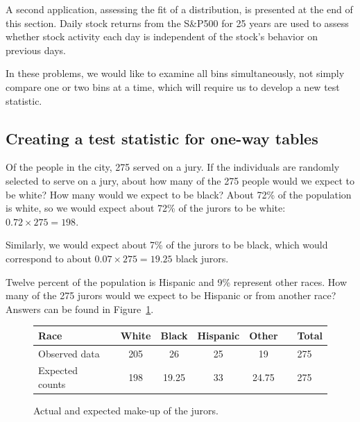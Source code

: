 A second application, assessing the fit of a distribution, is presented at the end of this section. Daily stock returns from the S\&P500 for 25 years are used to assess whether stock activity each day is independent of the stock's behavior on previous days.

In these problems, we would like to examine all bins simultaneously, not simply compare one or two bins at a time, which will require us to develop a new test statistic.


\subsection{Creating a test statistic for one-way tables}

\begin{examplewrap}
\begin{nexample}{Of the people in the city, 275 served on a jury. If the individuals are randomly selected to serve on a jury, about how many of the 275 people would we expect to be white? How many would we expect to be black?}
About 72\% of the population is white, so we would expect about 72\% of the jurors to be white: $0.72\times 275 = 198$.

Similarly, we would expect about 7\% of the jurors to be black, which would correspond to about $0.07\times 275 = 19.25$ black jurors.
\end{nexample}
\end{examplewrap}

\begin{exercisewrap}
\begin{nexercise}
Twelve percent of the population is Hispanic and 9\% represent other races. How many of the 275 jurors would we expect to be Hispanic or from another race? Answers can be found in Figure~\ref{expectedJuryRepresentationIfNoBias}.
\end{nexercise}
\end{exercisewrap}

\begin{figure}[h]
\centering
\begin{tabular}{ll ccc c ll}
\hline
Race	 & \hspace{2mm} & White & Black & Hispanic & Other & \hspace{2mm} & Total \\
\hline
Observed data			&	& 205 & 26	& 25 & 19	&	& 275 \\
Expected counts	 &	& 198 & 19.25 & 33 & 24.75 & & 275 \\
\hline
\end{tabular}
\caption{Actual and expected make-up of the jurors.}
\label{expectedJuryRepresentationIfNoBias}
\end{figure}

